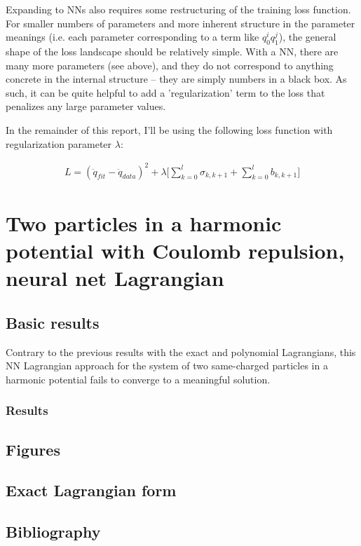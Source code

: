 \documentclass[]{article}
\begin{document}
Expanding to NNs also requires some restructuring of the training loss function.  For smaller numbers of parameters and more inherent structure in the parameter meanings (i.e. each parameter corresponding to a term like $q_0^i q_1^j$), the general shape of the loss landscape should be relatively simple. With a NN, there are many more parameters (see above), and they do not correspond to anything concrete in the internal structure -- they are simply numbers in a black box. As such, it can be quite helpful to add a 'regularization' term to the loss that penalizes any large parameter values.

In the remainder of this report, I'll be using the following loss function with regularization parameter $\lambda$:

\begin{eqnarray*}
	L = ( \ddot{q}_{fit} - \ddot{q}_{data})^2 + \lambda \Bigg[  \sum_{k=0}^{l} \sigma_{k,k+1} + \sum_{k=0}^{l} b_{k,k+1} \Bigg]
\end{eqnarray*}


\section{Two particles in a harmonic potential with Coulomb repulsion, neural net Lagrangian}
\subsection{Basic results}
Contrary to the previous results with the exact and polynomial Lagrangians, this NN Lagrangian approach for the system of two same-charged particles in a harmonic potential fails to converge to a meaningful solution. 





\subsubsection{Results}






\newpage
\begin{appendices}
\section{Figures}

\subsection{Exact Lagrangian form}











\end{appendices}



\newpage
\begin{appendices}
\section{Bibliography}
\printbibliography
\end{appendices}
\end{document}
